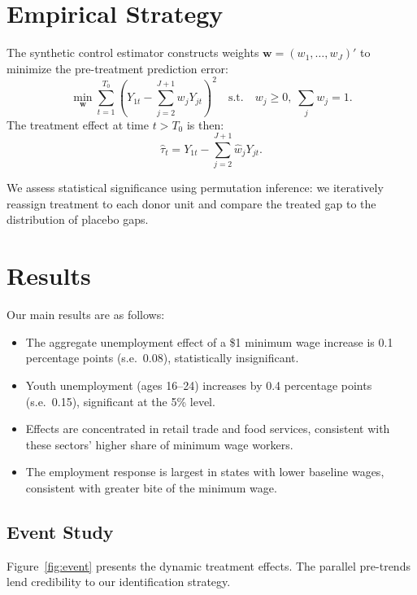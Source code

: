 \documentclass{article}
\begin{document}
\section{Empirical Strategy}

The synthetic control estimator constructs weights $\mathbf{w} = (w_1, \ldots, w_J)'$ to minimize the pre-treatment prediction error:
\[
  \min_{\mathbf{w}} \sum_{t=1}^{T_0} \left( Y_{1t} - \sum_{j=2}^{J+1} w_j Y_{jt} \right)^2 \quad \text{s.t.} \quad w_j \geq 0, \; \sum_j w_j = 1.
\]
The treatment effect at time $t > T_0$ is then:
\begin{equation}
  \hat{\tau}_t = Y_{1t} - \sum_{j=2}^{J+1} \hat{w}_j Y_{jt}.
  \label{eq:tau}
\end{equation}

We assess statistical significance using permutation inference: we iteratively reassign treatment to each donor unit and compare the treated gap to the distribution of placebo gaps.

\section{Results}

Our main results are as follows:

\begin{itemize}
  \item The aggregate unemployment effect of a \$1 minimum wage increase is 0.1 percentage points (s.e.\ 0.08), statistically insignificant.
  \item Youth unemployment (ages 16--24) increases by 0.4 percentage points (s.e.\ 0.15), significant at the 5\% level.
  \item Effects are concentrated in retail trade and food services, consistent with these sectors' higher share of minimum wage workers.
  \item The employment response is largest in states with lower baseline wages, consistent with greater bite of the minimum wage.
\end{itemize}

\subsection{Event Study}

Figure~\ref{fig:event} presents the dynamic treatment effects. The parallel pre-trends lend credibility to our identification strategy.
\end{document}
